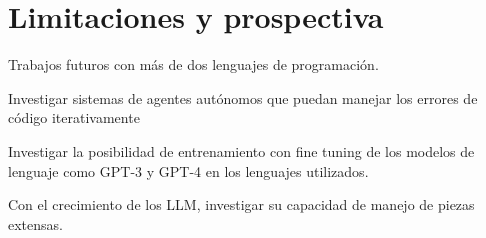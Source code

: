 \chapter{Limitaciones y prospectiva}


Trabajos futuros con más de dos lenguajes de programación.

Investigar sistemas de agentes autónomos que puedan manejar los errores de código iterativamente

Investigar la posibilidad de entrenamiento con fine tuning de los modelos de lenguaje como GPT-3 y GPT-4 en los lenguajes utilizados.

Con el crecimiento de los LLM, investigar su capacidad de manejo de piezas extensas.

